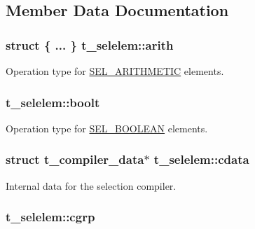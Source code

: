 \subsection{\-Member \-Data \-Documentation}
\hypertarget{structt__selelem_aa2647b18eb882e4fbc40169c6b7e1a8d}{
\subsubsection[{arith}]{\setlength{\rightskip}{0pt plus 5cm}struct \{ ... \}                                 {\bf t\-\_\-selelem\-::arith}}}\label{structt__selelem_aa2647b18eb882e4fbc40169c6b7e1a8d}
\-Operation type for \hyperlink{selelem_8h_a1f104d5c71b1198ef51acc4ef016ae46a8b75dccbec633c2002ea8c8fd3639b0e}{\-S\-E\-L\-\_\-\-A\-R\-I\-T\-H\-M\-E\-T\-I\-C} elements. \hypertarget{structt__selelem_a30d99a688718472ac787891e61e6d1ec}{
\subsubsection[{boolt}]{ {\bf t\-\_\-selelem\-::boolt}}}\label{structt__selelem_a30d99a688718472ac787891e61e6d1ec}
\-Operation type for \hyperlink{selelem_8h_a1f104d5c71b1198ef51acc4ef016ae46ae886c4e170c3abd5527de0af74ba4a45}{\-S\-E\-L\-\_\-\-B\-O\-O\-L\-E\-A\-N} elements. \hypertarget{structt__selelem_ad9857dc1c7385a2927b52b7033ec0768}{
\subsubsection[{cdata}]{\setlength{\rightskip}{0pt plus 5cm}struct {\bf t\-\_\-compiler\-\_\-data}$\ast$ {\bf t\-\_\-selelem\-::cdata}}}\label{structt__selelem_ad9857dc1c7385a2927b52b7033ec0768}
\-Internal data for the selection compiler. \hypertarget{structt__selelem_a3a5dd87256665de44876390abcb0eaba}{
\subsubsection[{cgrp}]{ {\bf t\-\_\-selelem\-::cgrp}}}\label{structt__selelem_a3a5dd87256665de44876390abcb0eaba}


